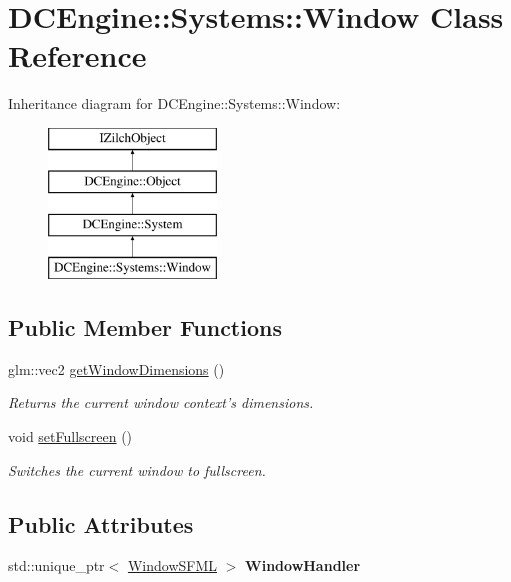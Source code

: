 \hypertarget{classDCEngine_1_1Systems_1_1Window}{\section{D\-C\-Engine\-:\-:Systems\-:\-:Window Class Reference}
\label{classDCEngine_1_1Systems_1_1Window}
}
Inheritance diagram for D\-C\-Engine\-:\-:Systems\-:\-:Window\-:\begin{figure}[H]
\begin{center}
\leavevmode
\includegraphics[height=4.000000cm]{classDCEngine_1_1Systems_1_1Window}
\end{center}
\end{figure}
\subsection*{Public Member Functions}
\begin{DoxyCompactItemize}
\item 
glm\-::vec2 \hyperlink{classDCEngine_1_1Systems_1_1Window_a09313c6a4f7156003bd3b4386bfccbb3}{get\-Window\-Dimensions} ()
\begin{DoxyCompactList}\small\item\em Returns the current window context's dimensions. \end{DoxyCompactList}\item 
\hypertarget{classDCEngine_1_1Systems_1_1Window_afba7684fefb90791853d91edc2ef3e0b}{void \hyperlink{classDCEngine_1_1Systems_1_1Window_afba7684fefb90791853d91edc2ef3e0b}{set\-Fullscreen} ()}\label{classDCEngine_1_1Systems_1_1Window_afba7684fefb90791853d91edc2ef3e0b}

\begin{DoxyCompactList}\small\item\em Switches the current window to fullscreen. \end{DoxyCompactList}\end{DoxyCompactItemize}
\subsection*{Public Attributes}
\begin{DoxyCompactItemize}
\item 
\hypertarget{classDCEngine_1_1Systems_1_1Window_a1b6791415fb5b640062a13c744a0c84a}{std\-::unique\-\_\-ptr$<$ \hyperlink{classDCEngine_1_1Systems_1_1WindowSFML}{Window\-S\-F\-M\-L} $>$ {\bfseries Window\-Handler}}\label{classDCEngine_1_1Systems_1_1Window_a1b6791415fb5b640062a13c744a0c84a}

\end{DoxyCompactItemize}
